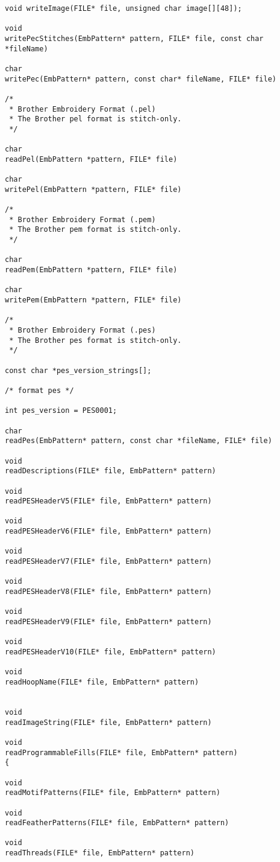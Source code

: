 \begin{lstlisting}
void writeImage(FILE* file, unsigned char image[][48]);

void
writePecStitches(EmbPattern* pattern, FILE* file, const char *fileName)

char
writePec(EmbPattern* pattern, const char* fileName, FILE* file)

/*
 * Brother Embroidery Format (.pel)
 * The Brother pel format is stitch-only.
 */

char
readPel(EmbPattern *pattern, FILE* file)

char
writePel(EmbPattern *pattern, FILE* file)

/*
 * Brother Embroidery Format (.pem)
 * The Brother pem format is stitch-only.
 */

char
readPem(EmbPattern *pattern, FILE* file)

char
writePem(EmbPattern *pattern, FILE* file)

/*
 * Brother Embroidery Format (.pes)
 * The Brother pes format is stitch-only.
 */

const char *pes_version_strings[];

/* format pes */

int pes_version = PES0001;

char
readPes(EmbPattern* pattern, const char *fileName, FILE* file)

void
readDescriptions(FILE* file, EmbPattern* pattern)

void
readPESHeaderV5(FILE* file, EmbPattern* pattern)

void
readPESHeaderV6(FILE* file, EmbPattern* pattern)

void
readPESHeaderV7(FILE* file, EmbPattern* pattern)

void
readPESHeaderV8(FILE* file, EmbPattern* pattern)

void
readPESHeaderV9(FILE* file, EmbPattern* pattern)

void
readPESHeaderV10(FILE* file, EmbPattern* pattern)

void
readHoopName(FILE* file, EmbPattern* pattern)


void
readImageString(FILE* file, EmbPattern* pattern)

void
readProgrammableFills(FILE* file, EmbPattern* pattern)
{

void
readMotifPatterns(FILE* file, EmbPattern* pattern)

void
readFeatherPatterns(FILE* file, EmbPattern* pattern)

void
readThreads(FILE* file, EmbPattern* pattern)


\end{lstlisting}
